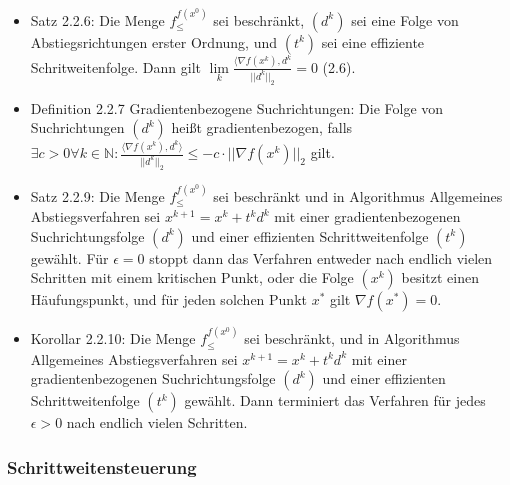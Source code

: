 \documentclass[paper=a4, fontsize=11pt]{scrartcl} %
\numberwithin{equation}{section} %
\numberwithin{figure}{section} %
\numberwithin{table}{section} %
\begin{document}
\begin{itemize}
\item Satz 2.2.6: Die Menge $f^{f(x^0)}_\le$ sei beschränkt, $(d^k)$ sei eine Folge von Abstiegsrichtungen erster Ordnung, und $(t^k)$ sei eine effiziente Schritweitenfolge. Dann gilt $\lim\limits_k \frac{\langle \nabla f(x^k), d^k}{||d^k||_2} = 0$ (2.6).
\item Definition 2.2.7 Gradientenbezogene Suchrichtungen: Die Folge von Suchrichtungen $(d^k)$ heißt gradientenbezogen, falls $\exists c > 0 \forall k \in \mathbb{N}: \frac{\langle \nabla f(x^k), d^k \rangle}{||d^k||_2} \le -c \cdot ||\nabla f(x^k)||_2$ gilt.
\item Satz 2.2.9: Die Menge $f^{f(x^0)}_\le$ sei beschränkt und in Algorithmus Allgemeines Abstiegsverfahren sei $x^{k+1} = x^k+t^kd^k$ mit einer gradientenbezogenen Suchrichtungsfolge $(d^k)$ und einer effizienten Schrittweitenfolge $(t^k)$ gewählt. Für $\epsilon = 0$ stoppt dann das Verfahren entweder nach endlich vielen Schritten mit einem kritischen Punkt, oder die Folge $(x^k)$ besitzt einen Häufungspunkt, und für jeden solchen Punkt $x^*$ gilt $\nabla f(x^*) = 0$.
\item Korollar 2.2.10: Die Menge $f^{f(x^0)}_\le$ sei beschränkt, und in Algorithmus Allgemeines Abstiegsverfahren sei $x^{k+1} = x^k+t^kd^k$ mit einer gradientenbezogenen Suchrichtungsfolge $(d^k)$ und einer effizienten Schrittweitenfolge $(t^k)$ gewählt. Dann terminiert das Verfahren für jedes $\epsilon > 0$ nach endlich vielen Schritten.
\end{itemize}

\subsubsection{Schrittweitensteuerung}
\end{document}
